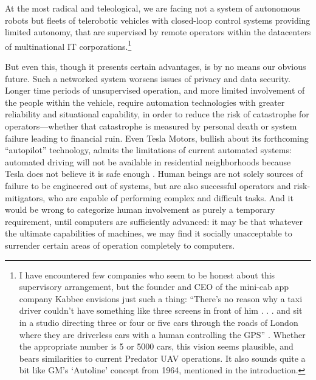 At the most radical and teleological, we are
facing not a system of autonomous robots but fleets of telerobotic
vehicles with closed-loop control systems providing limited autonomy,
that are supervised by remote operators within the datacenters of
multinational IT corporations.\footnote{I have encountered few
  companies who seem to be honest about this supervisory arrangement,
  but the founder and CEO of the mini-cab app company Kabbee envisions
just such a thing: ``There's no reason why a taxi driver couldn't have
something like three screens in front of him . . . and sit in a studio
directing three or four or five cars through the roads of London where
they are driverless cars with a human controlling the GPS''
\cite{forbesDawson}.
Whether the appropriate number is 5 or 5000 cars, this vision seems
plausible, and bears similarities to current Predator UAV operations.
It also sounds quite a bit like GM's `Autoline' concept from 1964,
mentioned in the introduction.}

But even this, though it presents certain advantages, is by no means
our obvious future. Such a networked system worsens issues of privacy
and data security. Longer time periods of unsupervised operation, and
more limited involvement of the people within the vehicle, require
automation technologies with greater reliability and situational
capability, in order to reduce the risk of catastrophe for
operators---whether that catastrophe is measured by personal death or
system failure leading to financial ruin. Even Tesla Motors, bullish
about its forthcoming ``autopilot'' technology, admits the limitations
of current automated systems: automated driving will not be available
in residential neighborhoods because Tesla does not believe it is safe
enough \cite{slashgearDaviesT}. Human beings are not solely
sources of failure to be engineered out of systems, but are also
successful operators and risk-mitigators, who are capable of
performing complex and difficult tasks. And it would be wrong to
categorize human involvement as purely a temporary requirement, until
computers are sufficiently advanced:  it
may be that whatever the ultimate capabilities of machines, we may
find it socially unacceptable to surrender certain areas of operation
completely to computers.


